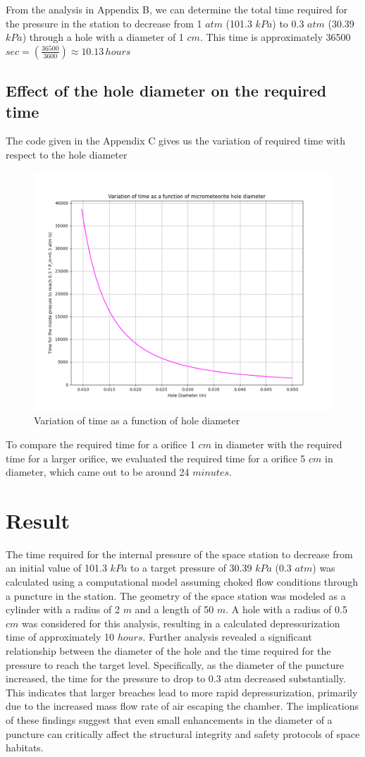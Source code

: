 \documentclass[a4paper, 14pt]{extarticle}
\begin{document}
From the analysis in Appendix B, we can determine the total time required for the pressure in the station to decrease from 1 $atm$ (101.3 $kPa$) to 0.3 $atm$ (30.39 $kPa$) through a hole with a diameter of 1 $cm$. This time is approximately 36500 $sec = \left(\frac{36500}{3600}\right) \approx 10.13 \,hours$
\newpage
\subsection{Effect of the hole diameter on the required time}
The code given in the Appendix C gives us the variation of required time with respect to the hole diameter
\begin{figure}[H]
\centering
\includegraphics[width=0.9\linewidth]{diameter_plot.png}
\caption{Variation of time as a function of hole diameter}
\end{figure}
To compare the required time for a orifice 1 $cm$ in diameter with the required time for a larger orifice, we evaluated the required time for a orifice 5 $cm$ in diameter, which came out to be around 24 $minutes$.

\section{Result}
The time required for the internal pressure of the space station to decrease from an initial value of 101.3 $kPa$ to a target pressure of 30.39 $kPa$ (0.3 $atm$) was calculated using a computational model assuming choked flow conditions through a puncture in the station. The geometry of the space station was modeled as a cylinder with a radius of 2 $m$ and a length of 50 $m$. A hole with a radius of 0.5 $cm$ was considered for this analysis, resulting in a calculated depressurization time of approximately 10 $hours$.
Further analysis revealed a significant relationship between the diameter of the hole and the time required for the pressure to reach the target level. Specifically, as the diameter of the puncture increased, the time for the pressure to drop to 0.3 atm decreased substantially. This indicates that larger breaches lead to more rapid depressurization, primarily due to the increased mass flow rate of air escaping the chamber. The implications of these findings suggest that even small enhancements in the diameter of a puncture can critically affect the structural integrity and safety protocols of space habitats.
\end{document}
